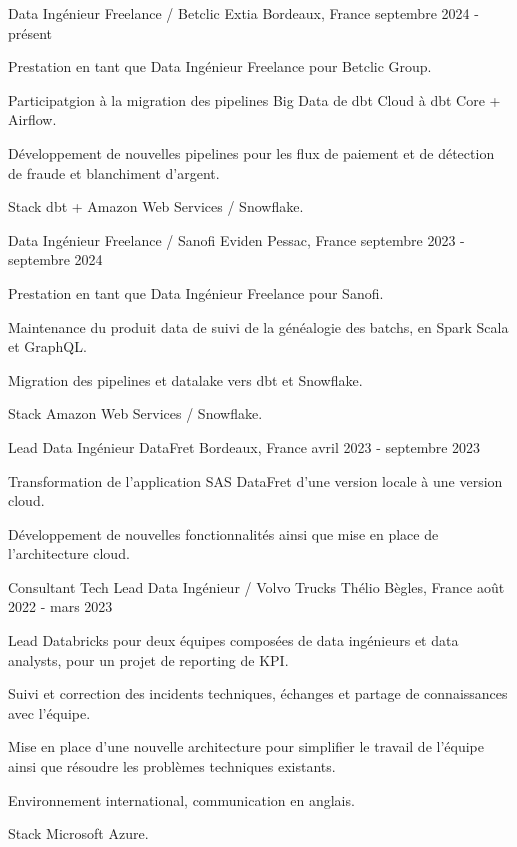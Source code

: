 
\begin{cventries}
	\cventry
	{Data Ingénieur Freelance / Betclic}
	{Extia}
	{Bordeaux, France}
	{septembre 2024 - présent}
	{
		\begin{cvitems}
			\item {Prestation en tant que Data Ingénieur Freelance pour Betclic Group.}
			\item {Participatgion à la migration des pipelines Big Data de dbt Cloud à dbt Core + Airflow.}
			\item {Développement de nouvelles pipelines pour les flux de paiement et de détection de fraude et blanchiment d'argent.}
			\item {Stack dbt + Amazon Web Services / Snowflake.}
		\end{cvitems}
	}

	\cventry
	{Data Ingénieur Freelance / Sanofi}
	{Eviden}
	{Pessac, France}
	{septembre 2023 - septembre 2024}
	{
		\begin{cvitems}
			\item {Prestation en tant que Data Ingénieur Freelance pour Sanofi.}
			\item {Maintenance du produit data de suivi de la généalogie des batchs, en Spark Scala et GraphQL.}
			\item {Migration des pipelines et datalake vers dbt et Snowflake.}
			\item {Stack Amazon Web Services / Snowflake.}
		\end{cvitems}
	}
	
	\cventry
	{Lead Data Ingénieur}
	{DataFret}
	{Bordeaux, France}
	{avril 2023 - septembre 2023}
	{
		\begin{cvitems}
			\item {Transformation de l'application SAS DataFret d'une version locale à une version cloud.}
			\item {Développement de nouvelles fonctionnalités ainsi que mise en place de l'architecture cloud.}
		\end{cvitems}
	}
	
	\cventry
	{Consultant Tech Lead Data Ingénieur / Volvo Trucks}
	{Thélio}
	{Bègles, France}
	{août 2022 - mars 2023}
	{
		\begin{cvitems}
			\item Lead Databricks pour deux équipes composées de data ingénieurs et data analysts, pour un projet de reporting de KPI.
			\item Suivi et correction des incidents techniques, échanges et partage de connaissances avec l'équipe.
			\item Mise en place d'une nouvelle architecture pour simplifier le travail de l'équipe ainsi que résoudre les problèmes techniques existants.
			\item Environnement international, communication en anglais.
			\item Stack Microsoft Azure.
		\end{cvitems}
	}
	

\end{cventries}
